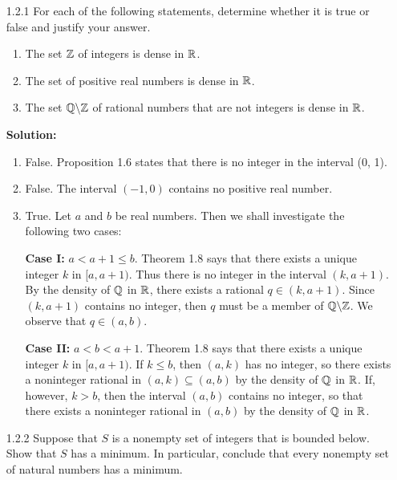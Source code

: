 \begin{enumerate}
   \item[1.2.1]   For each of the following statements, determine whether it is 
                  true or false and justify your answer.
                  \begin{enumerate}
                     \item The set $\mathbb{Z}$ of integers is dense in $\mathbb{R}$.
                     \item The set of positive real numbers is dense in $\mathbb{R}$.
                     \item The set $\mathbb{Q}\backslash \mathbb{Z}$ of rational numbers that 
                           are not integers is dense in $\mathbb{R}$.
                  \end{enumerate}  

      \textbf{Solution:} 

      \begin{enumerate}
         \item False. Proposition 1.6 states that there is no integer in the
               interval (0, 1).
         \item False. The interval $(-1, 0)$ contains no positive real number.
         \item True. Let $a$ and $b$ be real numbers. Then we shall investigate
               the following two cases:
               
               \textbf{Case I:} $a < a + 1 \le b$. Theorem 1.8 says that there
               exists a unique integer $k$ in $[a, a + 1)$. Thus there is no
               integer in the interval $(k, a + 1)$. By the density of $\mathbb{Q}$ in
               $\mathbb{R}$, there exists a rational $q \in (k, a + 1)$. Since
               $(k, a + 1)$ contains no integer, then $q$ must be a member of
               $\mathbb{Q}\backslash\mathbb{Z}$. We observe that $q \in (a, b)$.
               
               \textbf{Case II:} $a < b < a + 1$. Theorem 1.8 says that there
               exists a unique integer $k$ in $[a, a + 1)$. If $k  \le b$, then
               $(a, k)$ has no integer, so there exists a noninteger rational
               in $(a, k) \subseteq (a, b)$ by the density of $\mathbb{Q}$ in $\mathbb{R}$. If,
               however, $k > b$, then the interval $(a, b)$ contains no integer,
               so that there exists a noninteger rational in $(a, b)$ by the
               density of $\mathbb{Q}$ in $\mathbb{R}$.
      \end{enumerate}
   \item[1.2.2]   Suppose that $S$ is a nonempty set of integers that is bounded
                  below. Show that $S$ has a minimum. In particular, conclude
                  that every nonempty set of natural numbers has a minimum.  


\end{enumerate}
